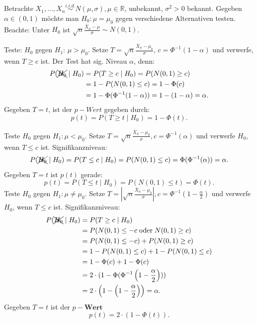\documentclass[10pt]{article}
\newcommand{\FZV}{X_1, \ldots, X_n} %
\newcommand{\IR}{\mathbb{R}} %
\newenvironment{BSP}[1][]
{\begin{Beispiel}[frametitle=#1]}{\end{Beispiel}}
\begin{document}
	\begin{BSP}[Beispiel 2.0.3 (Der z-Test (bekannte Varianz))]
		Betrachte $\FZV \overset{i.i.d.}{\sim} N(\mu,\sigma), \mu \in \IR$, unbekannt, $\sigma^2 > 0$ bekannt. Gegeben $\alpha \in (0,1)$ möchte man $H_0: \mu = \mu_0$ gegen verschiedene Alternativen testen. Beachte: Unter $H_0$ ist $\sqrt{n} \frac{\bar{X}_n - \mu}{\sigma} \sim N(0,1)$.
		
		Teste: $H_0$ gegen $H_1$: $\mu > \mu_0$. Setze $T = \sqrt{n} \frac{\bar{X}_n- \mu_0}{\sigma}$, $c = \Phi^{-1} (1- \alpha)$ und verwerfe, wenn $T\geq c$ ist. 
		Der Test hat sig. Niveau $\alpha$, denn: 
		\begin{equation*}
			\begin{split}
				P(\xcancel{H_0} \mid H_0) &= P(T \geq c \mid H_0) = P(N(0,1) \geq c)\\
				&= 1- P(N(0,1) \leq c) = 1- \Phi(c)\\
				&= 1- \Phi(\Phi^{-1}(1-\alpha)) = 1-(1-\alpha) = \alpha.
			\end{split}
		\end{equation*}
		Gegeben $T=t$, ist der $p-Wert$ gegeben durch:
		\begin{equation*}
			p(t) = P(T \geq t \mid H_0) = 1-\Phi(t). 
		\end{equation*}
		
		Teste $H_0$ gegen $H_1 : \mu < \mu_0$. Setze $T = \sqrt{n} \frac{\bar{X}_n - \mu_0}{\sigma}, c = \Phi^{-1}(\alpha)$ und verwerfe $H_0$, wenn $T \leq c$ ist. Signifikanzniveau:
		\begin{equation*}
			P(\xcancel{H_0} \mid H_0) = P(T \leq c \mid H_0) = P(N(0,1) \leq c) = \Phi(\Phi^{-1}(\alpha)) = \alpha.
		\end{equation*}
		Gegeben $T=t$ ist $p(t)$ gerade:
		\begin{equation*}
			p(t) = P(T \leq t \mid H_0) = P(N(0,1) \leq t) = \Phi(t).
		\end{equation*}
		Teste $H_0$ gegen $H_1: \mu \neq \mu_0$. Setze $T = \left\vert \sqrt{n} \frac{\bar{X}_n -\mu_0}{\sigma} \right\vert, c = \Phi^{-1} \left(1 -\frac{\alpha}{2}\right)$ und verwerfe $H_0$, wenn $T \leq c$ ist. Signifikanzniveau:
		\begin{equation*}
			\begin{split}
				P(\xcancel{H_0} \mid H_0) &= P(T \geq c \mid H_0)\\
				&= P(N(0,1) \leq -c \; \text{oder} \; N(0,1) \geq c)\\
				&= P(N(0,1) \leq -c) + P(N(0,1) \geq c)\\
				&= 1- P(N(0,1) \leq c) + 1 - P(N(0,1) \leq c)\\
				&= 1- \Phi(c) + 1- \Phi(c)\\
				&= 2 \cdot (1- \Phi(\Phi^{-1} \left(1 - \frac{\alpha}{2}\right)))\\
				&= 2 \cdot \left(1-\left(1-\frac{\alpha}{2}\right)\right) = \alpha.
			\end{split}
		\end{equation*}
		Gegeben $T=t$ ist der $p-\textbf{Wert}$
		\begin{equation*}
			p(t) = 2\cdot(1-\Phi(t)).
		\end{equation*}
	\end{BSP}
\end{document}
